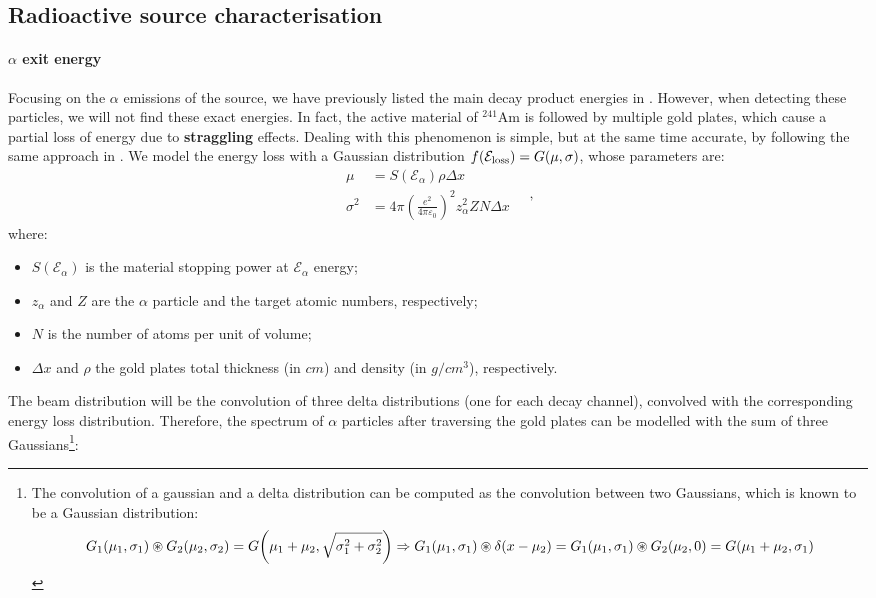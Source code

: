 \documentclass[../../main/main.tex]{subfiles}
\begin{document}
\subsection{Radioactive source characterisation}

\paragraph{\( \alpha \) exit energy}
Focusing on the \( \alpha \) emissions of the source, we have previously listed the main decay product energies in . However, when detecting these particles, we will not find these exact energies. In fact, the active material of \( {}^{241}\mathrm{Am} \) is followed by multiple gold plates, which cause a partial loss of energy due to \textbf{straggling} effects. Dealing with this phenomenon is simple, but at the same time accurate, by following the same approach in \cite{alphaMC}. We model the energy loss with a Gaussian distribution \( f\qty(\mathcal{E}_{\mathrm{loss}})=G(\mu,\sigma) \), whose parameters are:
\begin{equation}
    \begin{aligned}
        \mu
        &=
            S(\mathcal{E}_\alpha)\rho\Delta x \\
        \sigma^{2}
        &=
            4 \pi
            \left(
                \frac{e^{2}}{4 \pi \varepsilon_{0}}
            \right)^{2}
            z_{\alpha}^{2} Z N \Delta x
    \end{aligned}
    \quad ,
\end{equation}
where:
\begin{itemize}
    \item \( S(\mathcal{E}_{\alpha}) \) is the material stopping power at \( \mathcal{E}_{\alpha} \) energy;
    \item \( z_{\alpha} \) and \( Z \) are the \( \alpha \) particle and the target atomic numbers, respectively;
    \item \( N \) is the number of atoms per unit of volume;
    \item \( \Delta x \) and \( \rho \) the gold plates total thickness (in \( \si{cm} \)) and density (in \( \si{g/cm^{3}} \)), respectively.
\end{itemize}
The beam distribution will be the convolution of three delta distributions (one for each decay channel), convolved with the corresponding energy loss distribution. Therefore, the spectrum of \( \alpha \) particles after traversing the gold plates can be modelled with the sum of three Gaussians\footnote{The convolution of a gaussian and a delta distribution can be computed as the convolution between two Gaussians, which is known to be a Gaussian distribution:
\begin{equation}
    G_1(\mu_1, \sigma_1) \circledast G_2(\mu_2, \sigma_2)
    =
    G\qty(\mu_1 +\mu_2, \sqrt{\sigma_1^2+\sigma_2^2})
    \Rightarrow
    G_1(\mu_1, \sigma_1) \circledast \delta(x-\mu_2)
    =
    G_1(\mu_1, \sigma_1) \circledast G_2(\mu_2, 0)
    =
    G(\mu_1 +\mu_2, \sigma_1)
\end{equation}}:
\end{document}
